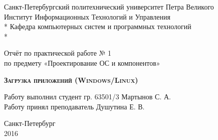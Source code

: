 \begin{titlepage}
\thispagestyle{empty}

\begin{center}
Санкт-Петербургский политехнический университет Петра Великого\\
Институт Информационных Технологий и Управления \\*
Кафедра компьютерных систем и программных технологий \\*
\hrulefill
\end{center}

\vspace{15em}

\begin{center}
\Large Отчёт по практической работе № 1\\по предмету «Проектирование ОС и компонентов» \\
\end{center}

\vspace{1em}

\begin{center}
\textsc{\textbf{Загрузка приложений (Windows/Linux)}}
\end{center}

\vspace{20em}

\begin{flushleft}
Работу выполнил студент гр. 63501/3 \hrulefill Мартынов С. А. \\
\vspace{1.5em}
Работу принял преподаватель \hrulefill Душутина Е. В. \\
\end{flushleft}

\vspace{\fill}

\begin{center}
Санкт-Петербург \\
2016
\end{center}

\end{titlepage}
\setcounter{page}{2}